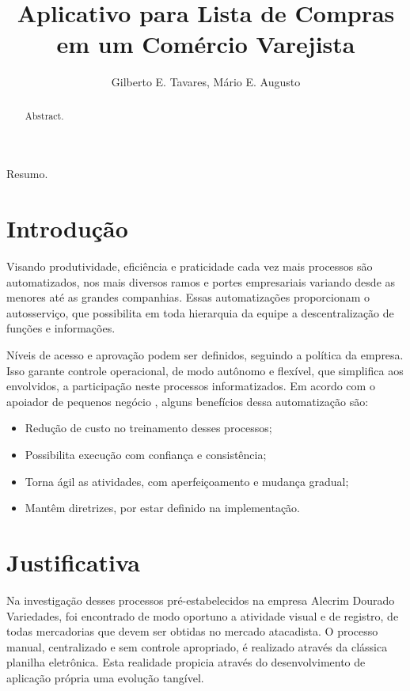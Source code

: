 \documentclass[12pt]{article}
\title{Aplicativo para Lista de Compras\\em um Comércio Varejista}
\author{Gilberto E. Tavares\inst{1}, Mário E. Augusto\inst{1}}
\begin{document}
\maketitle

\begin{abstract}
  Abstract.
\end{abstract}

\begin{resumo}
  Resumo.
\end{resumo}


\section{Introdução}

Visando produtividade, eficiência e praticidade cada vez mais processos são automatizados, nos mais diversos ramos e portes empresariais variando desde as menores até as grandes companhias. Essas automatizações proporcionam o autosserviço, que possibilita em toda hierarquia da equipe a descentralização de funções e informações.

Níveis de acesso e aprovação podem ser definidos, seguindo a política da empresa. Isso garante controle operacional, de modo autônomo e flexível, que simplifica aos envolvidos, a participação neste processos informatizados. Em acordo com o apoiador de pequenos negócio \cite{sebrae2015}, alguns benefícios dessa automatização são:

\begin{itemize}
\item Redução de custo no treinamento desses processos;
\item Possibilita execução com confiança e consistência;
\item Torna ágil as atividades, com aperfeiçoamento e mudança gradual;
\item Mantêm diretrizes, por estar definido na implementação.
\end{itemize}

\section{Justificativa}

Na investigação desses processos pré-estabelecidos na empresa Alecrim Dourado Variedades, foi encontrado de modo oportuno a atividade visual e de registro, de todas mercadorias que devem ser obtidas no mercado atacadista. O processo manual, centralizado e sem controle apropriado, é realizado através da clássica planilha eletrônica. Esta realidade propicia através do desenvolvimento de aplicação própria uma evolução tangível.
\end{document}
